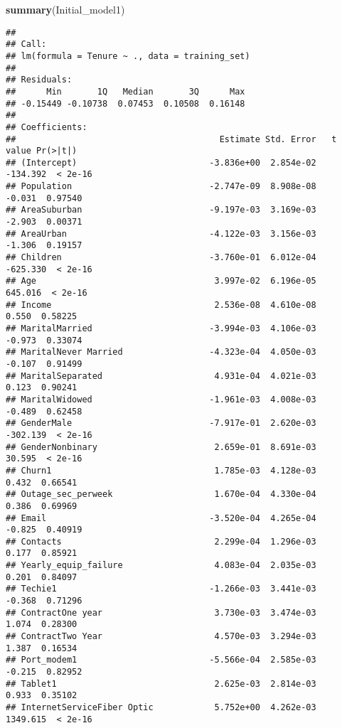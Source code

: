 \documentclass[
]{article}
\newenvironment{Shaded}{\begin{snugshade}}{\end{snugshade}}
\newcommand{\FunctionTok}[1]{\textcolor[rgb]{0.13,0.29,0.53}{\textbf{#1}}}
\newcommand{\NormalTok}[1]{#1}
\begin{document}
\begin{Shaded}
\begin{Highlighting}[]
\FunctionTok{summary}\NormalTok{(Initial\_model1)}
\end{Highlighting}
\end{Shaded}

\begin{verbatim}
## 
## Call:
## lm(formula = Tenure ~ ., data = training_set)
## 
## Residuals:
##      Min       1Q   Median       3Q      Max 
## -0.15449 -0.10738  0.07453  0.10508  0.16148 
## 
## Coefficients:
##                                        Estimate Std. Error   t value Pr(>|t|)
## (Intercept)                          -3.836e+00  2.854e-02  -134.392  < 2e-16
## Population                           -2.747e-09  8.908e-08    -0.031  0.97540
## AreaSuburban                         -9.197e-03  3.169e-03    -2.903  0.00371
## AreaUrban                            -4.122e-03  3.156e-03    -1.306  0.19157
## Children                             -3.760e-01  6.012e-04  -625.330  < 2e-16
## Age                                   3.997e-02  6.196e-05   645.016  < 2e-16
## Income                                2.536e-08  4.610e-08     0.550  0.58225
## MaritalMarried                       -3.994e-03  4.106e-03    -0.973  0.33074
## MaritalNever Married                 -4.323e-04  4.050e-03    -0.107  0.91499
## MaritalSeparated                      4.931e-04  4.021e-03     0.123  0.90241
## MaritalWidowed                       -1.961e-03  4.008e-03    -0.489  0.62458
## GenderMale                           -7.917e-01  2.620e-03  -302.139  < 2e-16
## GenderNonbinary                       2.659e-01  8.691e-03    30.595  < 2e-16
## Churn1                                1.785e-03  4.128e-03     0.432  0.66541
## Outage_sec_perweek                    1.670e-04  4.330e-04     0.386  0.69969
## Email                                -3.520e-04  4.265e-04    -0.825  0.40919
## Contacts                              2.299e-04  1.296e-03     0.177  0.85921
## Yearly_equip_failure                  4.083e-04  2.035e-03     0.201  0.84097
## Techie1                              -1.266e-03  3.441e-03    -0.368  0.71296
## ContractOne year                      3.730e-03  3.474e-03     1.074  0.28300
## ContractTwo Year                      4.570e-03  3.294e-03     1.387  0.16534
## Port_modem1                          -5.566e-04  2.585e-03    -0.215  0.82952
## Tablet1                               2.625e-03  2.814e-03     0.933  0.35102
## InternetServiceFiber Optic            5.752e+00  4.262e-03  1349.615  < 2e-16

\end{verbatim}
\end{document}
